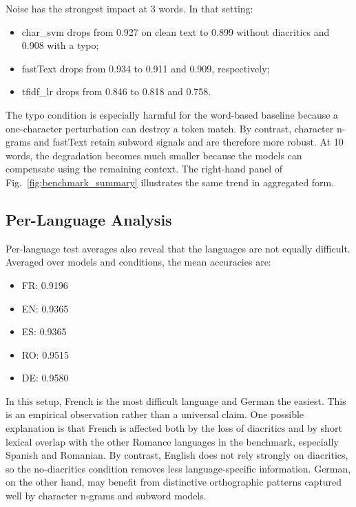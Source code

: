 \documentclass[conference]{IEEEtran}
\begin{document}
Noise has the strongest impact at 3 words. In that setting:

\begin{itemize}
    \item char\_svm drops from 0.927 on clean text to 0.899 without diacritics and 0.908 with a typo;
    \item fastText drops from 0.934 to 0.911 and 0.909, respectively;
    \item tfidf\_lr drops from 0.846 to 0.818 and 0.758.
\end{itemize}

The typo condition is especially harmful for the word-based baseline because a one-character perturbation can destroy a token match. By contrast, character n-grams and fastText retain subword signals and are therefore more robust. At 10 words, the degradation becomes much smaller because the models can compensate using the remaining context. The right-hand panel of Fig.~\ref{fig:benchmark_summary} illustrates the same trend in aggregated form.

\subsection{Per-Language Analysis}

Per-language test averages also reveal that the languages are not equally difficult. Averaged over models and conditions, the mean accuracies are:

\begin{itemize}
    \item FR: 0.9196
    \item EN: 0.9365
    \item ES: 0.9365
    \item RO: 0.9515
    \item DE: 0.9580
\end{itemize}

In this setup, French is the most difficult language and German the easiest. This is an empirical observation rather than a universal claim. One possible explanation is that French is affected both by the loss of diacritics and by short lexical overlap with the other Romance languages in the benchmark, especially Spanish and Romanian. By contrast, English does not rely strongly on diacritics, so the no-diacritics condition removes less language-specific information. German, on the other hand, may benefit from distinctive orthographic patterns captured well by character n-grams and subword models.
\end{document}
